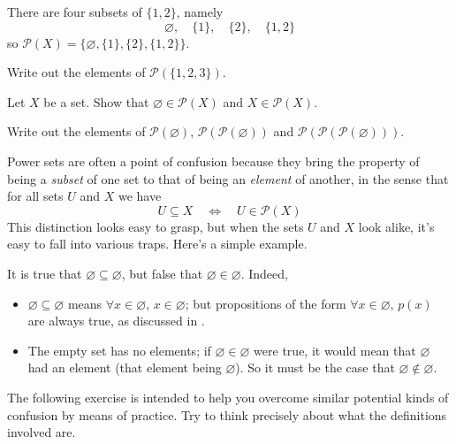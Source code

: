 \begin{example}
There are four subsets of $\{ 1, 2 \}$, namely
\[ \varnothing, \quad \{ 1 \}, \quad \{ 2 \}, \quad \{ 1, 2 \} \]
so $\mathcal{P}(X) = \{\varnothing, \{ 1 \}, \{ 2 \}, \{ 1, 2 \}\}$.
\end{example}

\begin{exercise}
Write out the elements of $\mathcal{P}(\{1, 2, 3\})$.
\end{exercise}

\begin{exercise}
Let $X$ be a set. Show that $\varnothing \in \mathcal{P}(X)$ and $X \in \mathcal{P}(X)$.
\end{exercise}

\begin{exercise}
Write out the elements of $\mathcal{P}(\varnothing)$, $\mathcal{P}(\mathcal{P}(\varnothing))$ and $\mathcal{P}(\mathcal{P}(\mathcal{P}(\varnothing)))$.
\end{exercise}

Power sets are often a point of confusion because they bring the property of being a \textit{subset} of one set to that of being an \textit{element} of another, in the sense that for all sets $U$ and $X$ we have
\[ U \subseteq X \quad \Leftrightarrow \quad U \in \mathcal{P}(X) \]
This distinction looks easy to grasp, but when the sets $U$ and $X$ look alike, it's easy to fall into various traps. Here's a simple example.

\begin{example}
It is true that $\varnothing \subseteq \varnothing$, but false that $\varnothing \in \varnothing$. Indeed,
\begin{itemize}
\item $\varnothing \subseteq \varnothing$ means $\forall x \in \varnothing,\, x \in \varnothing$; but propositions of the form $\forall x \in \varnothing,\, p(x)$ are always true, as discussed in .
\item The empty set has no elements; if $\varnothing \in \varnothing$ were true, it would mean that $\varnothing$ had an element (that element being $\varnothing$). So it must be the case that $\varnothing \not \in \varnothing$.
\end{itemize}
\end{example}

The following exercise is intended to help you overcome similar potential kinds of confusion by means of practice. Try to think precisely about what the definitions involved are.

